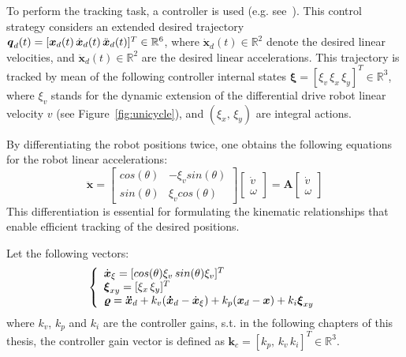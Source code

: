 To perform the tracking task, a  controller is used (e.g. see~\cite{cDFL}).
This control strategy considers an extended desired trajectory $\boldsymbol{q}_d(t) = [\boldsymbol{x}_d(t) \, \dot{\boldsymbol{x}}_d(t) \, \ddot{\boldsymbol{x}}_d(t)]^T \in \mathbb{R}^6$, where $\Dot{\boldsymbol{x}}_d(t) \in \mathbb{R}^2$ denote the desired linear velocities, and $\ddot{\boldsymbol{x}}_d(t) \in \mathbb{R}^2$ are the desired linear accelerations.
This trajectory is tracked by mean of the following controller internal states $\boldsymbol{\xi} = [\xi_v \, \xi_x \, \xi_y]^T \in \mathbb{R}^3$, where $\xi_v$ stands for the dynamic extension of the differential drive robot linear velocity $v$ (see Figure~\ref{fig:unicycle}), and $(\xi_x, \, \xi_y)$ are integral actions. 

By differentiating the robot positions twice, one obtains the following equations for the robot linear accelerations:
\begin{equation*}
  \ddot{\boldsymbol{x}}
  = 
  \begin{bmatrix}
    cos(\theta) & -\xi_v sin(\theta) \\
    sin(\theta) & \xi_v cos(\theta) 
  \end{bmatrix} 
  \begin{bmatrix}
    \dot{v} \\
    \omega
  \end{bmatrix}
  = \boldsymbol{A} \begin{bmatrix}
    \dot{v} \\
    \omega
  \end{bmatrix}
\end{equation*}
This differentiation is essential for formulating the kinematic relationships that enable efficient tracking of the desired positions.

Let the following vectors:
\begin{equation}\label{eq:unic_control_law}
  \left \{
  \begin{array}{l l l}
       \dot{\boldsymbol{x}}_{\xi} = [cos(\theta)\xi_v \, sin(\theta)\xi_v]^T \\
       \boldsymbol{\xi}_{xy} = [\xi_x \, \xi_y]^T \\
       \boldsymbol{\varrho} = \boldsymbol{\ddot{x}}_d + k_v(\boldsymbol{\dot{x}}_d - \dot{\boldsymbol{x}}_{\xi}) + k_p(\boldsymbol{x}_{d} - \boldsymbol{x}) + k_i\boldsymbol{\xi}_{xy}
  \end{array}
  \right .
\end{equation}
where $k_v$, $k_p$ and $k_i$ are the controller gains, s.t. in the following chapters of this thesis, the controller gain vector is defined as $\boldsymbol{k}_c = [k_p, \, k_v \, k_i]^T \in \mathbb{R}^3$.

